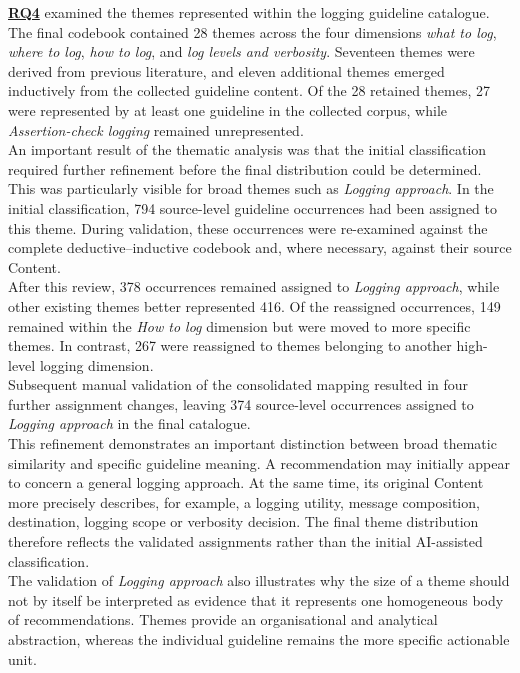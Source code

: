 \hyperref[table:t1rq]{\textbf{RQ4}} examined the themes represented within the logging guideline catalogue.
\\
The final codebook contained 28 themes across the four dimensions \textit{what to log}, \textit{where to log}, \textit{how to log}, and \textit{log levels and verbosity}. 
Seventeen themes were derived from previous literature, and eleven additional themes emerged inductively from the collected guideline content.
Of the 28 retained themes, 27 were represented by at least one guideline in the collected corpus, while \textit{Assertion-check logging} remained unrepresented.
\\
An important result of the thematic analysis was that the initial classification required further refinement before the final distribution could be determined. 
This was particularly visible for broad themes such as \textit{Logging approach}. 
In the initial classification, 794 source-level guideline occurrences had been assigned to this theme. 
During validation, these occurrences were re-examined against the complete deductive--inductive codebook and, where necessary, against their source Content.
\\
After this review, 378 occurrences remained assigned to \textit{Logging approach}, while other existing themes better represented 416. 
Of the reassigned occurrences, 149 remained within the \textit{How to log} dimension but were moved to more specific themes.
In contrast, 267 were reassigned to themes belonging to another high-level logging dimension.
\\
Subsequent manual validation of the consolidated mapping resulted in four further
assignment changes, leaving 374 source-level occurrences assigned to
\textit{Logging approach} in the final catalogue.
\\
This refinement demonstrates an important distinction between broad thematic similarity and specific guideline meaning. 
A recommendation may initially appear to concern a general logging approach. At the same time, its original Content more precisely describes, for example, a logging utility, message composition, destination, logging scope or verbosity decision. 
The final theme distribution therefore reflects the validated assignments rather than the initial AI-assisted classification.
\\
The validation of \textit{Logging approach} also illustrates why the size of a theme should not by itself be interpreted as evidence that it represents one homogeneous body of recommendations. 
Themes provide an organisational and analytical abstraction, whereas the individual guideline remains the more specific actionable unit. 
